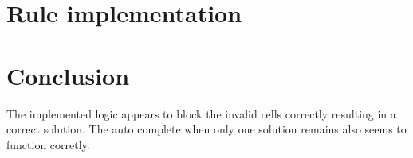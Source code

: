 \section{Rule implementation}

\section{Conclusion}
The implemented logic appears to block the invalid cells correctly resulting in a correct solution. The auto complete when only one solution remains also seems to function corretly.